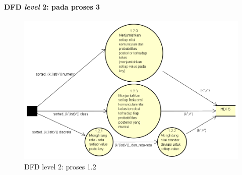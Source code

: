\paragraph{DFD \textit{level} 2: pada proses 3}
\begin{figure}[H]
	\centering
	\includegraphics[scale=0.6]{Diagram/DFD_1_3_Training_Red}
	\caption[DFD level 2: proses 1.2]{DFD level 2: proses 1.2}
	\label{fig:DFD level 2: proses 1.2}
\end{figure}

